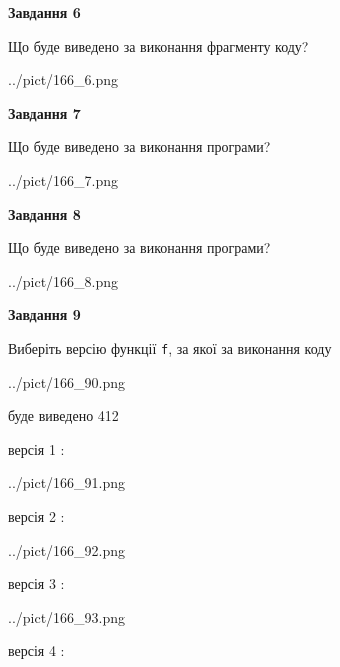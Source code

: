 \documentclass[12pt, ukrainian]{article}
\def\code#1{\Verb!#1!}
\begin{document}
{\begin {large}
{\begin {center}\textbf{Завдання 6}\end {center}}

Що буде виведено за виконання фрагменту коду?\par
\begin{center}
	{../pict/166_6.png}
\end{center}
\newpage

{\begin {center}\textbf{Завдання 7}\end {center}}

Що буде виведено за виконання програми?\par
\begin{center}
	{../pict/166_7.png}
\end{center}
\newpage

{\begin {center}\textbf{Завдання 8}\end {center}}

Що буде виведено за виконання програми?\par
\begin{center}
	{../pict/166_8.png}
\end{center}
\newpage

{\begin {center}\textbf{Завдання 9}\end {center}}

Виберіть версію функції \code{f}, за якої за виконання коду
\begin{center}
	{../pict/166_90.png}
\end{center}
буде виведено 412

\vspace{5mm}
версія 1 :

\begin{center}
	{../pict/166_91.png}
\end{center}
версія 2 :

\begin{center}
	{../pict/166_92.png}
\end{center}
версія 3 :

\begin{center}
	{../pict/166_93.png}
\end{center}
версія 4 :


\end{large}}
\end{document}

